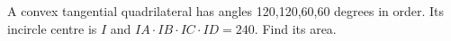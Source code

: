 A convex tangential quadrilateral has angles 120,120,60,60 degrees in order. Its incircle centre is $I$ and $IA\cdot IB\cdot IC\cdot ID=240$. Find its area.
